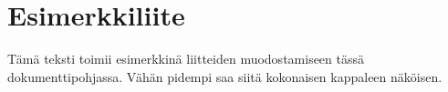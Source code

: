 \chapter{Esimerkkiliite}
\label{ch:liite}

Tämä teksti toimii esimerkkinä liitteiden muodostamiseen tässä dokumenttipohjassa. Vähän pidempi saa siitä kokonaisen kappaleen näköisen.
